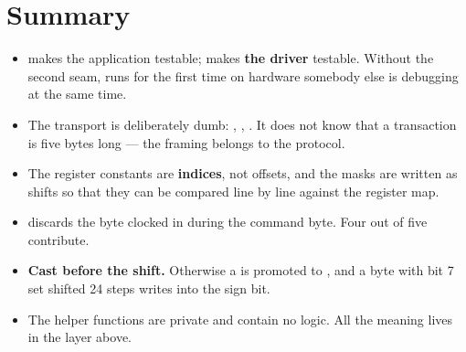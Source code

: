 \section*{Summary}

\begin{itemize}
  \item {} makes the application testable;  makes \textbf{the
    driver} testable. Without the second seam,  runs for the first time on hardware
    somebody else is debugging at the same time.
  \item The transport is deliberately dumb: , ,
    . It does not know that a transaction is five bytes long --- the framing
    belongs to the protocol.
  \item The register constants are \textbf{indices}, not offsets, and the masks are written as
    shifts so that they can be compared line by line against the register map.
  \item {} discards the byte clocked in during the command byte. Four out of five
    contribute.
  \item \textbf{Cast before the shift.} Otherwise a  is promoted to ,
    and a byte with bit 7 set shifted 24 steps writes into the sign bit.
  \item The helper functions are private and contain no logic. All the meaning lives in the layer
    above.
\end{itemize}
